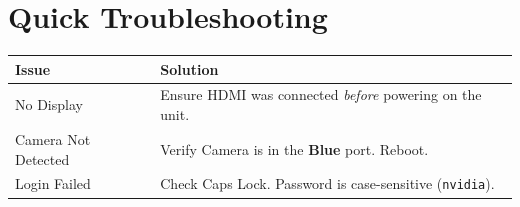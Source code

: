 \documentclass[a4paper,10pt]{article}
\begin{document}
	\section{Quick Troubleshooting}
	\vspace{0.1cm}
	\begin{table}[h]
		\centering
		\small
		\renewcommand{\arraystretch}{1.3} %
		\begin{tabular}{|p{3.5cm}|p{12.0cm}|}
			\hline
			\textbf{Issue} & \textbf{Solution} \\ \hline
			No Display & Ensure HDMI was connected \textit{before} powering on the unit. \\ \hline
			Camera Not Detected & Verify Camera is in the \textbf{Blue} port. Reboot. \\ \hline
			Login Failed & Check Caps Lock. Password is case-sensitive (\texttt{nvidia}). \\ \hline
		\end{tabular}
	\end{table}
	
\end{document}
